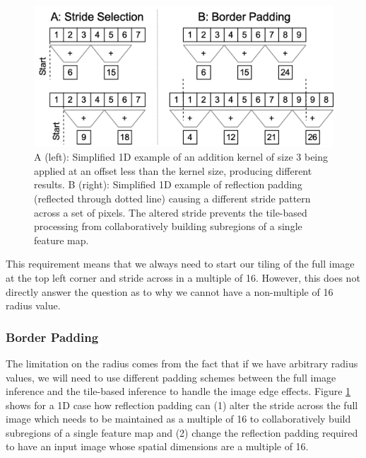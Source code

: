 \documentclass[letterpaper]{article} %
\begin{document}

\begin{figure}[h!]
	\centering
		\includegraphics[width=\linewidth]{figs/partitioning.png}
	\caption{A (left): Simplified 1D example of an addition kernel of size 3 being applied at an offset less than the kernel size, producing different results.
	B (right): Simplified 1D example of reflection padding (reflected through dotted line) causing a different stride pattern across a set of pixels. The altered stride prevents the tile-based processing from collaboratively building subregions of a single feature map.}
	\label{fig:offset}
\end{figure}

This requirement means that we always need to start our tiling of the full image at the top left corner and stride across in a multiple of 16. However, this does not directly answer the question as to why we cannot have a non-multiple of 16 radius value. 

\subsubsection{Border Padding}
The limitation on the radius comes from the fact that if we have arbitrary radius values, we will need to use different padding schemes between the full image inference and the tile-based inference to handle the image edge effects. Figure \ref{fig:offset} shows for a 1D case how reflection padding can (1) alter the stride across the full image which needs to be maintained as a multiple of 16 to collaboratively build subregions of a single feature map and (2) change the reflection padding required to have an input image whose spatial dimensions are a multiple of 16.
\end{document}
